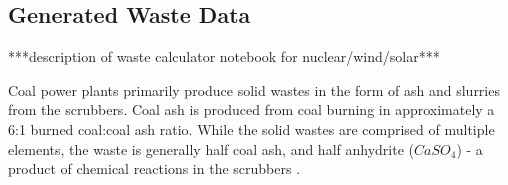 \subsection{Generated Waste Data}
***description of waste calculator notebook for nuclear/wind/solar***

Coal power plants primarily produce solid wastes in the form of ash and slurries from the scrubbers.  Coal ash is produced from coal burning in approximately a 6:1 burned coal:coal ash ratio.  While the solid wastes are comprised of multiple elements, the waste is generally half coal ash, and half anhydrite ($CaSO_4$) - a product of chemical reactions in the scrubbers \cite{brown_solid_1996}.


